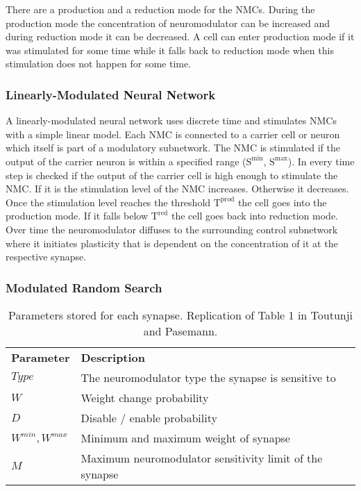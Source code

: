 \documentclass[12pt,twoside]{scrartcl}
\theoremstyle{plain}
\theoremstyle{definition}
\theoremstyle{remark}
\begin{document}
There are a production and a reduction mode for the NMCs. During the production
mode the concentration of neuromodulator can be increased and during reduction
mode it can be decreased. A cell can enter production mode if it was stimulated
for some time while it falls back to reduction mode when this stimulation
does not happen for some time.

\subsubsection*{Linearly-Modulated Neural Network}

A linearly-modulated neural network uses discrete time and stimulates NMCs
with a simple linear model. Each NMC is connected to a carrier cell or neuron
which itself is part of a modulatory subnetwork. The NMC is stimulated if the
output of the carrier neuron is within a specified range
(\(\text{S}^{\text{min}}\), \(\text{S}^{\text{max}}\)). In every time step
is checked if the output of the carrier cell is high enough to stimulate the
NMC. If it is the stimulation level of the NMC increases. Otherwise it decreases.
Once the stimulation level reaches the threshold \(\text{T}^{\text{prod}}\)
the cell goes into the production mode. If it falls below \(\text{T}^{\text{red}}\)
the cell goes back into reduction mode.
Over time the neuromodulator diffuses to the surrounding control subnetwork
where it initiates plasticity that is dependent on the concentration of it at
the respective synapse.

\subsubsection*{Modulated Random Search}

\begin{table}
    \begin{tabular}{l|l}
        \textbf{Parameter} & \textbf{Description} \\
        \(Type\) & The neuromodulator type the synapse is sensitive to \\
        \(W\) & Weight change probability \\
        \(D\) & Disable / enable probability \\
        \(W^{min}, W^{max}\) & Minimum and maximum weight of synapse \\
        \(M\) & Maximum neuromodulator sensitivity limit of the synapse
    \end{tabular}
    \caption{Parameters stored for each synapse.
    Replication of Table 1 in Toutunji and Pasemann\cite{Toutounji2016}.}
    \label{tab:mrs-synapse}
\end{table}
\end{document}
